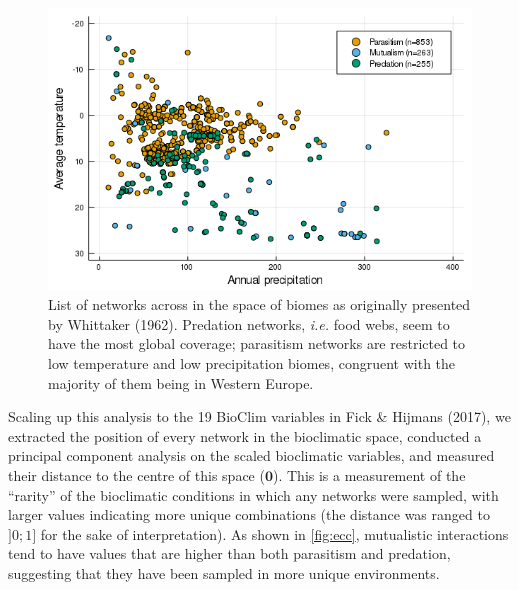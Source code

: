 \begin{figure}
\hypertarget{fig:biomes}{%
\centering
\includegraphics{figures/figure_02.png}
\caption{List of networks across in the space of biomes as originally
presented by Whittaker (1962). Predation networks, \emph{i.e.} food
webs, seem to have the most global coverage; parasitism networks are
restricted to low temperature and low precipitation biomes, congruent
with the majority of them being in Western Europe.}\label{fig:biomes}
}
\end{figure}

Scaling up this analysis to the 19 BioClim variables in Fick \& Hijmans
(2017), we extracted the position of every network in the bioclimatic
space, conducted a principal component analysis on the scaled
bioclimatic variables, and measured their distance to the centre of this
space (\(\mathbf{0}\)). This is a measurement of the ``rarity'' of the
bioclimatic conditions in which any networks were sampled, with larger
values indicating more unique combinations (the distance was ranged to
\(]0;1]\) for the sake of interpretation). As shown in \cref{fig:ecc},
mutualistic interactions tend to have values that are higher than both
parasitism and predation, suggesting that they have been sampled in more
unique environments.

